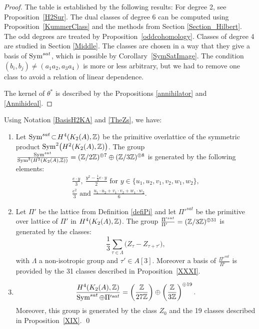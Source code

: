 \begin{proof}
The table is established by the following results:
For degree 2, see Proposition~\ref{H2Sur}. The dual classes of degree 6 can be computed using Proposition~\ref{KummerClass} and the methods from Section \ref{Section_Hilbert}.
The odd degrees are treated by Proposition~\ref{oddcohomology}. Classes of degree 4 are studied in Section \ref{Middle}. The classes are chosen in a way that they give a basis of $\operatorname{Sym}^{sat}$, which is possible by Corollary~\ref{SymSatImage}. The condition $(b_i,b_j)\neq(a_1a_2,a_3a_4)$ is more or less arbitrary, but we had to remove one class to avoid a relation of linear dependence.

The kernel of $\theta^*$ is described by the Propositions \ref{annihilator} and \ref{Annihideal}.
\end{proof}


\begin{thm}\label{integralbasistheorem}
Using Notation \ref{BasisH2KA} and \ref{TheZs}, we have:
\begin{enumerate}
\item
Let $\operatorname{Sym}^{sat}\!\subset \! H^4(K_2(A),\mathbb{Z})$ be the primitive overlattice of the symmetric product $\operatorname{Sym}^2\!\left(H^2\!\left(K_{ 2 }( A ),\mathbb{Z}\right)\right)$.
The group $\frac{\operatorname{Sym}^{sat}}{\operatorname{Sym}^2\left(H^2\left(K_{ 2 }( A ),\mathbb{Z}\right)\right)}=(\mathbb{Z}/2\mathbb{Z})^{\oplus 7}\oplus(\mathbb{Z}/3\mathbb{Z})^{\oplus 8}$ is generated by the following elements:
\begin{gather*}
\frac{e \cdot y}{3},\ \frac{y^2 - \frac{1}{3} e\cdot y}{2} \text{ for } y\in\{u_1,u_2,v_1,v_2,w_1,w_2\},\\
\frac{e^2}{3} \text{ and } \frac{u_{1}\cdot u_{2}+v_{1}\cdot v_{2}+w_{1}\cdot w_{2}}{6}.
\end{gather*}
\item
Let $\Pi'$ be the lattice from Definition \ref{defiPi} and let $\Pi'^{sat}$ be the primitive over lattice of $\Pi'$ in $H^4(K_2(A),\mathbb{Z})$.
The group $\frac{\Pi'^{sat}}{\Pi'\ \ \ }=(\mathbb{Z}/3\mathbb{Z})^{\oplus 31}$ is generated by the classes:
$$\frac{1}{3}\sum_{\tau\in\Lambda} \Big(Z_{\tau} - Z_{\tau+\tau'}\Big),
$$
with $\Lambda$ a non-isotropic group and $\tau'\in A[3]$. Moreover a basis of $\frac{\Pi'^{sat}}{\Pi'\ \ \ }$ is provided by the 31 classes described in Proposition~\ref{XXXI}. 
\item
$$
\frac{H^4(K_2(A),\mathbb{Z})}{\operatorname{Sym}^{sat}\oplus\Pi'^{sat}}=\left(\frac{\mathbb{Z}}{27\mathbb{Z}}\right)\oplus\left(\frac{\mathbb{Z}}{3\mathbb{Z}}\right)^{\oplus 19}.
$$
Moreover, this group is generated by the class $Z_0$ and the 19 classes described in Proposition~\ref{XIX}.
\qed
\end{enumerate}
\end{thm}


